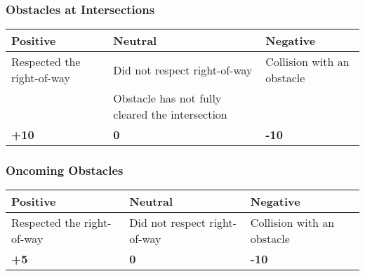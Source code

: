 {	\begin{highlight}
		\subsubsection*{Obstacles at Intersections}
		\begin{table}[H]
			\begin{tabularx}{\textwidth}{XXX}
				\toprule
				\textbf{Positive}          & \textbf{Neutral}                                & \textbf{Negative}          \\
				\midrule
				Respected the right-of-way \footnotemark[2] & Did not respect right-of-way \footnotemark[2]                    & Collision with an obstacle \\
				                           & Obstacle has not fully cleared the intersection &                            \\
				\topstrut
				\textbf{+10}               & \textbf{0}                                      & \textbf{-10}               \\
				\bottomrule
			\end{tabularx}
		\end{table}

		\subsubsection*{Oncoming Obstacles}
		\begin{table}[H]
			\begin{tabularx}{\textwidth}{XXX}
				\toprule
				\textbf{Positive}                           & \textbf{Neutral}             & \textbf{Negative}          \\
				\midrule
				Respected the right-of-way \footnotemark[2] & Did not respect right-of-way \footnotemark[2] & Collision with an obstacle \\
				\topstrut
				\textbf{+5}                                 & \textbf{0}                   & \textbf{-10}               \\
				\bottomrule
			\end{tabularx}
		\end{table}

		\newpage


\end{highlight}}
